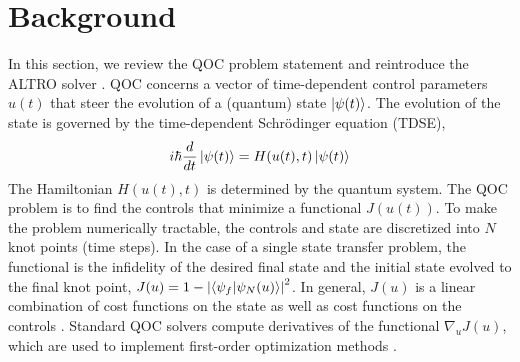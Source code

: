 \section{Background \label{sec:background}}
In this section, we
review the QOC problem statement
and reintroduce the ALTRO solver \cite{howell2019altro}.
QOC concerns a vector of time-dependent control parameters $u(t)$
that steer the evolution of a (quantum) state $\ket{\psi(t)}$.
The evolution of the state is governed by the time-dependent
Schr{\"o}dinger equation (TDSE),
\begin{equation}
  i \hbar \frac{d}{dt} \ket{\psi(t)} = H(u(t), t) \ket{\psi(t)}
  \label{eq:tdse}
\end{equation}
The Hamiltonian $H(u(t), t)$ is determined by the quantum system.
The QOC problem is to find the
controls that minimize a functional $J(u(t))$.
To make the problem numerically tractable,
the controls and state are discretized into $N$ knot points (time steps).
In the case of a single state transfer problem, the functional is
the infidelity of the desired final state and the initial state evolved
to the final knot point,
$J(u) = 1 - {\lvert \braket{\psi_{f}}{\psi_{N}(u)} \rvert}^{2}$.
In general, $J(u)$ is a linear combination of cost functions on the state
as well as cost functions on the controls \cite{leung2017speedup}.
Standard QOC solvers compute derivatives of the functional $\nabla_{u} J(u)$,
which are used to implement first-order optimization methods
\cite{machnes2015tunable, khaneja2005optimal, leung2017speedup, goerz2019krotov}.



